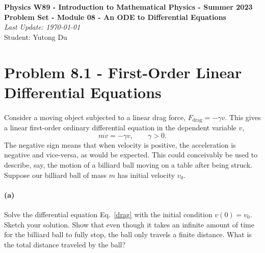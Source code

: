 \documentclass{article}
\begin{document}
\addcopyright
\begin{center}
{\bf \large Physics W89 - Introduction to Mathematical Physics - Summer 2023}\\\medskip
{\bf \large Problem Set - Module 08 - An ODE to Differential Equations} \\\medskip
{\emph{Last Update: \today}}\\\medskip
{Student: Yutong Du}
\end{center}

\dphline
\bigskip
\section*{Problem 8.1 - First-Order Linear Differential Equations}


\paragraph{}
Consider a moving object subjected to a linear drag force, $F_{\textrm{drag}} = -\gamma v$.  This gives a linear first-order ordinary differential 
equation in the dependent variable $v$,
	\begin{equation}
		m\dot{v} = -\gamma v,	\qquad \gamma >0.
	\label{drag}
	\end{equation}
The negative sign means that when velocity is positive, the acceleration is negative and vice-versa, as would be expected.  
This could conceivably be used to describe, say, the motion of a billiard ball moving on a table after being struck.  Suppose our billiard ball of mass $m$
has initial velocity $v_{0}$.

\paragraph{(a)}
Solve the differential equation Eq.~\ref{drag} with the initial condition $v(0) = v_{0}$.
Sketch your solution.
Show that even though it takes an infinite amount of time for the billiard ball to fully stop, the ball only travels a finite distance.  
What is the total distance traveled by the ball?
\end{document}
